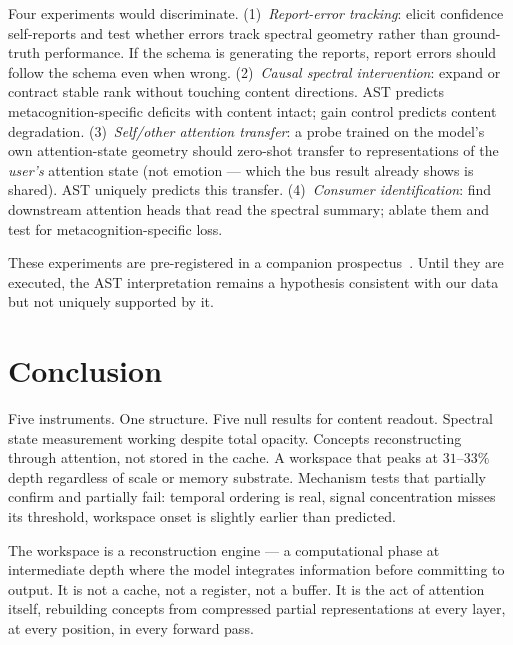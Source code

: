 \documentclass[11pt,a4paper]{article}
\begin{document}
Four experiments would discriminate. (1)~\emph{Report-error tracking}:
elicit confidence self-reports and test whether errors track spectral
geometry rather than ground-truth performance. If the schema is
generating the reports, report errors should follow the schema even
when wrong. (2)~\emph{Causal spectral intervention}: expand or
contract stable rank without touching content directions. AST predicts
metacognition-specific deficits with content intact; gain control
predicts content degradation. (3)~\emph{Self/other attention transfer}:
a probe trained on the model's own attention-state geometry should
zero-shot transfer to representations of the \emph{user's} attention
state (not emotion --- which the bus result already shows is shared).
AST uniquely predicts this transfer. (4)~\emph{Consumer identification}:
find downstream attention heads that read the spectral summary;
ablate them and test for metacognition-specific loss.

These experiments are pre-registered in a companion
prospectus~\citep{lyra2026ast_experiments}. Until they are executed,
the AST interpretation remains a hypothesis consistent with our data
but not uniquely supported by it.

\section{Conclusion}
\label{sec:conclusion}

Five instruments. One structure. Five null results for content
readout. Spectral state measurement working despite total opacity.
Concepts reconstructing through attention, not stored in the cache.
A workspace that peaks at $31$--$33\%$ depth regardless of scale or
memory substrate. Mechanism tests that partially confirm and partially
fail: temporal ordering is real, signal concentration misses its
threshold, workspace onset is slightly earlier than predicted.

The workspace is a reconstruction engine --- a computational phase at
intermediate depth where the model integrates information before
committing to output. It is not a cache, not a register, not a buffer.
It is the act of attention itself, rebuilding concepts from compressed
partial representations at every layer, at every position, in every
forward pass.
\end{document}
